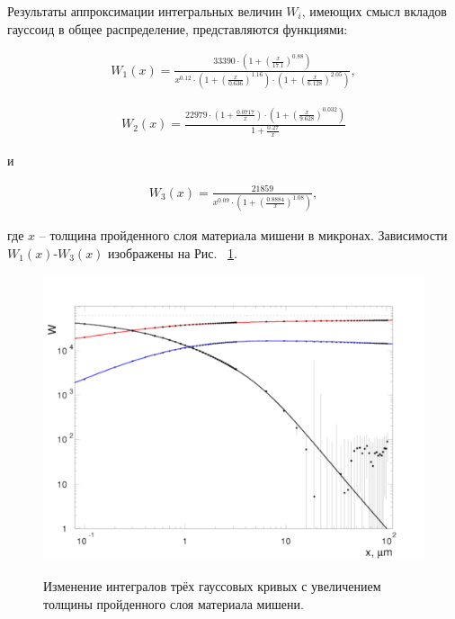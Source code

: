 \documentclass[a4paper,12pt]{article}
\begin{document}
\begin{large}
  	Результаты аппроксимации интегральных величин $W_i$, имеющих смысл вкладов гауссоид в общее распределение, представляются функциями:
  
\begin{equation}
\label{MSApproximationW1}
\begin{aligned} 
W_1(x)= \frac{33390\cdot (1+\left(\frac{x}{17.1}\right)^{0.88})}{x^{0.12} \cdot \left(1+\left(\frac{x}{0.636}\right)^{1.16}\right) \cdot \left(1+\left(\frac{x}{6.128}\right)^{2.05}\right)},
\end{aligned}
\end{equation}

\begin{equation}
\label{MSApproximationW2}
\begin{aligned} 
W_2(x)= \frac{22979\cdot \left(1+\frac{0.0717}{x}\right)\cdot \left(1+\left(\frac{x}{9.628}\right)^{0.032}\right)}{1+\frac{0.27}{x}}
\end{aligned}
\end{equation}

и

\begin{equation}
\label{MSApproximationW3}
\begin{aligned} 
W_3(x)= \frac{21859}{x^{0.09}\cdot\left(1+\left(\frac{0.8884}{x}\right)^{1.08}\right)},
\end{aligned}
\end{equation}

	где $x$ -- толщина пройденного слоя материала мишени в микронах.
	Зависимости $W_1(x)$-$W_3(x)$ изображены на Рис. ~\ref{fig:Par1theta}.

\begin{figure}[ht]
  {
     \includegraphics[width=0.99\linewidth]{images/pars135}
  }
  \caption{Изменение интегралов трёх гауссовых кривых с увеличением толщины пройденного слоя материала мишени.}
  \label{fig:Par1theta}
\end{figure}


\end{large}
\end{document}
